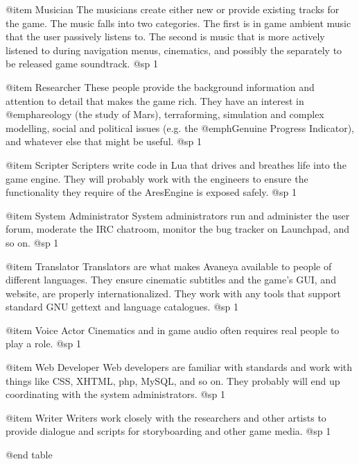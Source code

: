 @item Musician
The musicians create either new or provide existing tracks for the game. The music falls into two categories. The first is in game ambient music that the user passively listens to. The second is music that is more actively listened to during navigation menus, cinematics, and possibly the separately to be released game soundtrack.
@sp 1

@item Researcher
These people provide the background information and attention to detail that makes the game rich. They have an interest in @emph{areology} (the study of Mars), terraforming, simulation and complex modelling, social and political issues (e.g. the @emph{Genuine Progress Indicator}), and whatever else that might be useful.
@sp 1

@item Scripter
Scripters write code in Lua that drives and breathes life into the game engine. They will probably work with the engineers to ensure the functionality they require of the AresEngine is exposed safely.
@sp 1

@item System Administrator
System administrators run and administer the user forum, moderate the IRC chatroom, monitor the bug tracker on Launchpad, and so on.
@sp 1

@item Translator
Translators are what makes Avaneya available to people of different languages. They ensure cinematic subtitles and the game's GUI, and website, are properly internationalized. They work with any tools that support standard GNU gettext and language catalogues.
@sp 1

@item Voice Actor
Cinematics and in game audio often requires real people to play a role.
@sp 1

@item Web Developer
Web developers are familiar with standards and work with things like CSS, XHTML, php, MySQL, and so on. They probably will end up coordinating with the system administrators.
@sp 1

@item Writer
Writers work closely with the researchers and other artists to provide dialogue and scripts for storyboarding and other game media.
@sp 1

@end table

